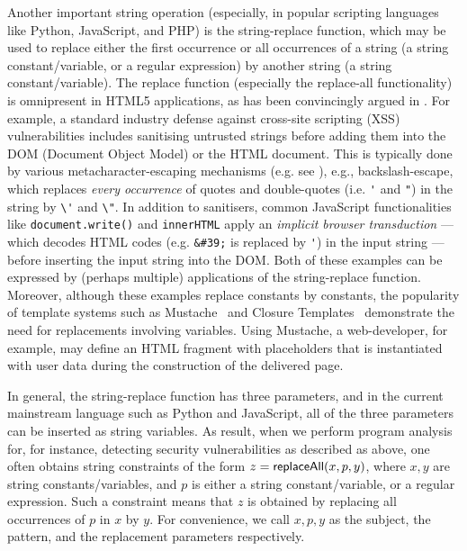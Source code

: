 Another important string operation (especially, in popular scripting
languages like Python, JavaScript, and PHP) is the string-replace function, 
which may be used to replace either the first occurrence or
all occurrences of a string (a string constant/variable, or a regular expression) by 
another string (a string constant/variable). The replace function (especially 
the replace-all functionality) is omnipresent in HTML5 applications, as has
been convincingly argued in \cite{LB16,TCJ16,YABI14}. 
For
example, a standard industry defense against cross-site scripting 
(XSS) vulnerabilities includes sanitising untrusted strings before adding them
into the DOM (Document Object Model) or the HTML document. 
This is typically done by %
various metacharacter-escaping mechanisms (e.g. see 
\cite{Kern14,BEK,OWASP-XSS}), e.g., backslash-escape, which replaces \emph{every
occurrence} of quotes and double-quotes (i.e. \verb+'+ and \verb+"+) in the
string by \verb+\'+ and \verb+\"+. 
In addition
to sanitisers, common JavaScript functionalities like \texttt{document.write()} 
and \texttt{innerHTML} apply an \emph{implicit browser transduction} --- which
decodes HTML codes (e.g. \verb+&#39;+ is replaced by \verb+'+) in the input 
string --- before inserting the input string into the DOM.
Both of these examples can be expressed by (perhaps multiple) 
applications of the string-replace function.
Moreover, although these examples replace constants by constants, the popularity of template systems such as Mustache~\cite{Mustache} and Closure Templates~\cite{Closure} demonstrate the need for replacements involving variables.
Using Mustache, a web-developer, for example, may define an HTML fragment with placeholders that is instantiated with user data during the construction of the delivered page.


In general, the string-replace function has three parameters, and in the current mainstream language such as Python and JavaScript, all of the three parameters can be inserted as string variables. As result, when we perform program analysis for, for instance, detecting security vulnerabilities as described as above, one often obtains string constraints of the form $z= \mathsf{replaceAll}(x, p, y)$, where $x,y$ are string constants/variables, and $p$ is either a string constant/variable, or a regular expression.
Such a constraint means that $z$ is obtained by replacing all occurrences of $p$ in $x$ by $y$. For convenience, we call $x, p, y$ as the subject, the pattern, and the replacement parameters respectively. 

